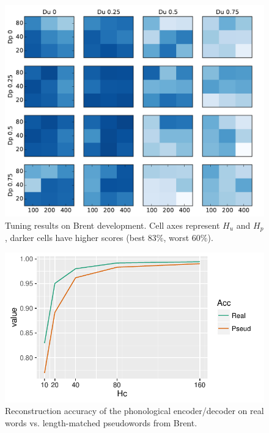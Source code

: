 \documentclass[11pt,letterpaper]{article}
\begin{document}
\begin{figure}
\includegraphics[width=\columnwidth]{heatmap.pdf}
\caption{Tuning results on Brent development. Cell axes represent
  $H_u$ and $H_p$, darker cells have higher scores (best 83\%, worst
  60\%).}
\label{fig-gridsearch}
\end{figure}

\begin{figure}
\includegraphics[width=\columnwidth]{capacity.pdf}
\caption{Reconstruction accuracy of the phonological encoder/decoder
  on real words vs. length-matched pseudowords from Brent.}
\label{fig-capacity}
\end{figure}
\end{document}
